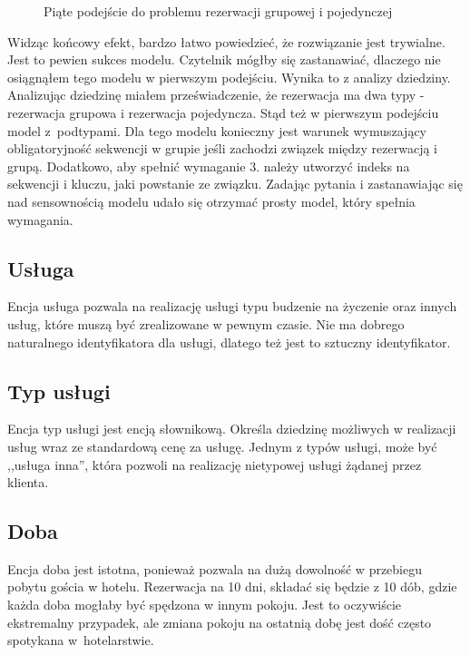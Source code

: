 \documentclass[a4paper,onecolumn,oneside,11pt,wide,floatssmall]{mwrep}
\theoremstyle{definition}
\theoremstyle{plain}%
\theoremstyle{remark}
\begin{document}
\begin{figure}[H]
  \begin{center}
  \end{center}
  \caption{Piąte podejście do problemu rezerwacji grupowej i pojedynczej}
  \label{fig:db-logical-model-group-reservation-fifth-try}
\end{figure}

Widząc końcowy efekt, bardzo łatwo powiedzieć, że rozwiązanie jest trywialne. Jest to pewien sukces modelu. Czytelnik mógłby się zastanawiać, dlaczego nie osiągnąłem tego modelu w pierwszym podejściu. Wynika to z analizy dziedziny. Analizując dziedzinę miałem przeświadczenie, że rezerwacja ma dwa typy - rezerwacja grupowa i rezerwacja pojedyncza. Stąd też w pierwszym podejściu model \mbox{z podtypami}. Dla tego modelu konieczny jest warunek wymuszający obligatoryjność sekwencji w grupie jeśli zachodzi związek między rezerwacją i grupą. Dodatkowo, aby spełnić wymaganie 3. należy utworzyć indeks na sekwencji i kluczu, jaki powstanie ze związku. Zadając pytania i zastanawiając się nad sensownością modelu udało się otrzymać prosty model, który spełnia wymagania.

\subsection{Usługa}
Encja usługa pozwala na realizację usługi typu budzenie na życzenie oraz innych usług, które muszą być zrealizowane w pewnym czasie. Nie ma dobrego naturalnego identyfikatora dla usługi, dlatego też jest to sztuczny identyfikator.

\subsection{Typ usługi}
Encja typ usługi jest encją słownikową. Określa dziedzinę możliwych w realizacji usług wraz ze standardową cenę za usługę. Jednym z typów usługi, może być ,,usługa inna'', która pozwoli na realizację nietypowej usługi żądanej przez klienta.

\subsection{Doba}
Encja doba jest istotna, ponieważ pozwala na dużą dowolność w przebiegu pobytu gościa w hotelu. Rezerwacja na 10 dni, składać się będzie z 10 dób, gdzie każda doba mogłaby być spędzona w innym pokoju. Jest to oczywiście ekstremalny przypadek, ale zmiana pokoju na ostatnią dobę jest dość często spotykana \mbox{w hotelarstwie}.
\end{document}
